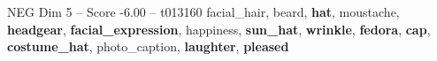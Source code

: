 \begin{textsample}{NEG Dim 5 – Score -6.00 – t013160}  \label{ex:f5_neg_019}
facial\_hair, beard, \textbf{hat}, moustache, \textbf{headgear}, \textbf{facial\_expression}, happiness, \textbf{sun\_hat}, \textbf{wrinkle}, \textbf{fedora}, \textbf{cap}, \textbf{costume\_hat}, photo\_caption, \textbf{laughter}, \textbf{pleased}

\end{textsample}
